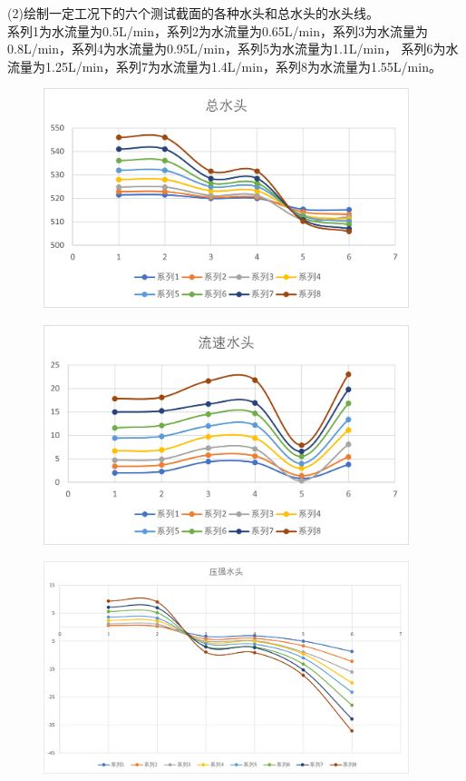 \documentclass[dvipsnames, svgnames,a4paper,11pt]{article}
\begin{document}
(2)绘制一定工况下的六个测试截面的各种水头和总水头的水头线。\\
系列1为水流量为0.5L/min，系列2为水流量为0.65L/min，系列3为水流量为0.8L/min，系列4为水流量为0.95L/min，系列5为水流量为1.1L/min，
系列6为水流量为1.25L/min，系列7为水流量为1.4L/min，系列8为水流量为1.55L/min。\par
\begin{figure}[!h]
	\includegraphics[width=0.95\textwidth]{2-1.png}
\end{figure}
\begin{figure}[!h]
	\includegraphics[width=0.95\textwidth]{2-2.png}
\end{figure}
\begin{figure}[!h]
	\includegraphics[width=0.95\textwidth]{2-3.png}
\end{figure}\par
\end{document}
